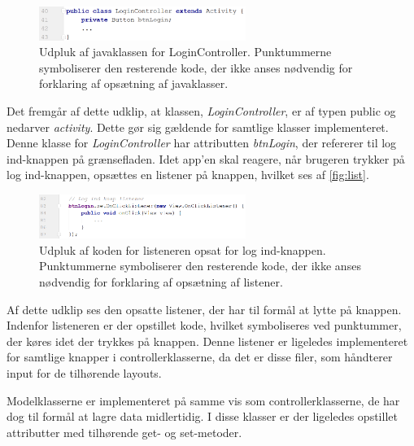 \begin{figure} [H]
\centering
\includegraphics[width=0.6\textwidth]{figures/imple/javaclass}
\caption{Udpluk af javaklassen for LoginController. Punktummerne symboliserer den resterende kode, der ikke anses nødvendig for forklaring af opsætning af javaklasser.}
\label{fig:javaclass}
\end{figure}

\noindent
Det fremgår af dette udklip, at klassen, \textit{LoginController}, er af typen public og nedarver \textit{activity}. Dette gør sig gældende for samtlige klasser implementeret. Denne klasse for \textit{LoginController} har attributten \textit{btnLogin}, der refererer til log ind-knappen på grænsefladen. Idet app'en skal reagere, når brugeren trykker på log ind-knappen, opsættes en listener på knappen, hvilket ses af \autoref{fig:list}.


\begin{figure} [H]
\centering
\includegraphics[width=0.6\textwidth]{figures/imple/list}
\caption{Udpluk af koden for listeneren opsat for log ind-knappen. Punktummerne symboliserer den resterende kode, der ikke anses nødvendig for forklaring af opsætning af listener.}
\label{fig:list}
\end{figure}


\noindent
Af dette udklip ses den opsatte listener, der har til formål at lytte på knappen. Indenfor listeneren er der opstillet kode, hvilket symboliseres ved punktummer, der køres idet der trykkes på knappen. Denne listener er ligeledes implementeret for samtlige knapper i controllerklasserne, da det er disse filer, som håndterer input for de tilhørende layouts.

Modelklasserne er implementeret på samme vis som controllerklasserne, de har dog til formål at lagre data midlertidig. I disse klasser er der ligeledes opstillet attributter med tilhørende get- og set-metoder. 

